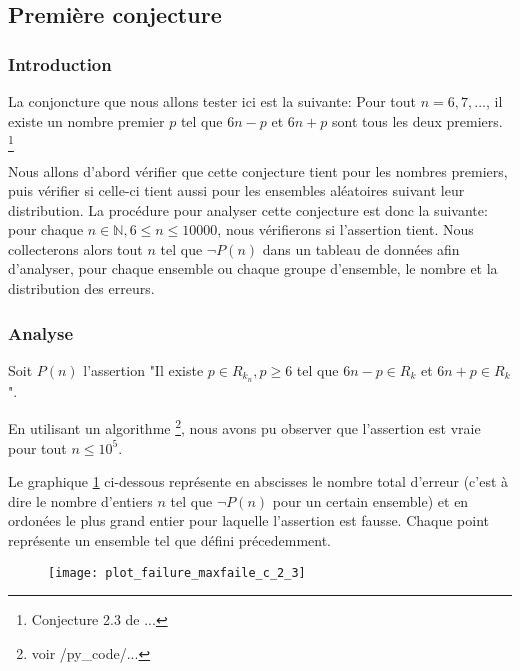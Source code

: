 \documentclass[../main.text]{report}
\begin{document}
\subsection{Première conjecture}
\subsubsection{Introduction}

La conjoncture que nous allons tester ici est la suivante: 
Pour tout $n = 6, 7, ...$, il existe un nombre premier $p$ tel que $6n-p$ et $6n+p$ sont tous les deux premiers. \footnote{Conjecture 2.3 de ...}

Nous allons d'abord vérifier que cette conjecture tient pour les nombres premiers, puis vérifier si celle-ci tient aussi pour les ensembles aléatoires suivant leur distribution.
La procédure pour analyser cette conjecture est donc la suivante: pour chaque $n\in \mathbb{N}, 6 \leq n \leq 10000$, nous vérifierons si l'assertion tient. Nous collecterons alors tout $n$ tel que $\neg P(n)$ dans un tableau de données afin d'analyser, pour chaque ensemble ou chaque groupe d'ensemble, le nombre et la distribution des erreurs.


\subsubsection{Analyse}


Soit $P(n)$ l'assertion "Il existe $p \in R_{k_n}, p \geq 6$ tel que $6n-p \in R_k$ et $6n+p \in R_k$".

En utilisant un algorithme \footnote{voir /py\_code/... }, nous avons pu observer que l'assertion est vraie pour tout $n \leq 10^5$.

Le graphique \ref{fig:failures_2_3} ci-dessous représente en abscisses le nombre total d'erreur (c'est à dire le nombre d'entiers $n$ tel que $\neg P(n)$ pour un certain ensemble) et en ordonées le plus grand entier pour laquelle l'assertion est fausse. Chaque point représente un ensemble tel que défini précedemment.

\begin{figure}[H]
\centering
\texttt{[image: plot\_failure\_maxfaile\_c\_2\_3]}
\caption{}
\label{fig:failures_2_3}
\end{figure}
\end{document}
